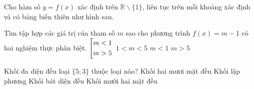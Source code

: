 	\begin{ex}%
		Cho hàm số $y=f(x)$ xác định trên $\mathbb{R}\backslash\big\{1\big\}$, liên tục trên mỗi khoảng xác định và có bảng biến thiên như hình sau.
		\begin{center}
		\end{center}
		Tìm tập hợp các giá trị của tham số $m$ sao cho phương trình $f(x)=m-1$ có hai nghiệm thực phân biệt.
		\choice
		{\True $\left[\begin{aligned}&m<1\\&m>5\end{aligned}\right.$}
		{$1<m<5$}
		{$m<1$}
		{$m>5$}
	\end{ex}
	\begin{ex}%
		Khối đa diện đều loại $\big\{5;3\big\}$ thuộc loại nào?
		\choice
		{Khối hai mươi mặt đều}
		{Khối lập phương}
		{Khối bát diện đều}
		{\True Khối mười hai mặt đều}
	\end{ex}
	
